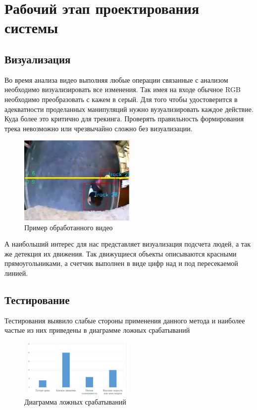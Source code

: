 \documentclass[12pt]{article}
\begin{document}
	\section{Рабочий этап проектирования системы}	

		\subsection{Визуализация}
Во время анализа видео выполняя любые операции связанные с анализом необходимо визуализировать все изменения. Так имея на входе обычное RGB необходимо преобразовать с кажем в серый. Для того чтобы удостоверится в адекватности проделанных манипуляций нужно вузуализировать каждое действие. Куда более это критично для трекинга. Проверять правильность формирования трека невозможно или чрезвычайно сложно без визуализации. 

		\begin{figure}[h!]
			\centering
			\includegraphics[width=0.5\textwidth]{pic/result_1_1.jpg}
			\caption{Пример обработанного видео}
		\end{figure}	

А наибольший интерес для нас представляет визуализация подсчета людей, а так же детекция их движения. Так движущиеся объекты описываются красными прямоугольниками, а счетчик выполнен в виде цифр над и под пересекаемой линией.

		\subsection{Тестирование}

Тестирования выявило слабые стороны применения данного метода и наиболее частые из них приведены в диаграмме ложных срабатываний
		\begin{figure}[h!]
			\centering
			\includegraphics[width=0.5\textwidth]{pic/diogr.jpg}
			\caption{Диаграмма ложных срабатываний}
		\end{figure}
\end{document}
